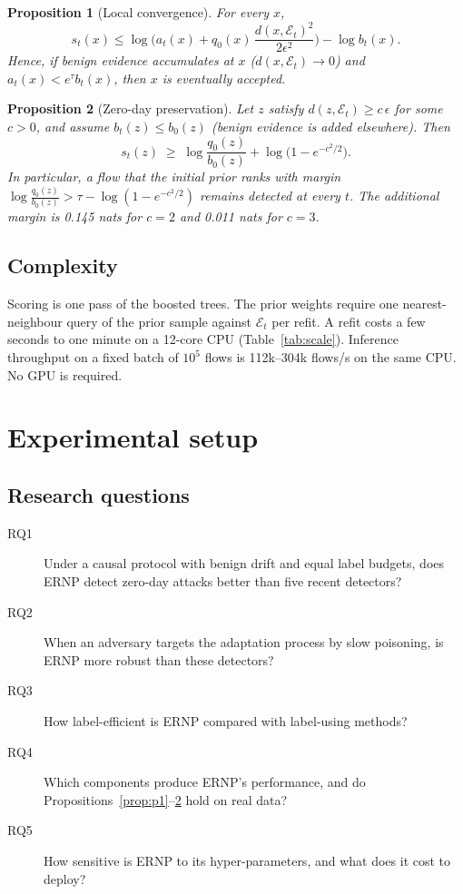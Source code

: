 \documentclass[preprint,12pt]{elsarticle}
\newtheorem{proposition}{Proposition}
\newcommand{\E}{\mathcal{E}}
\begin{document}
\begin{proposition}[Local convergence]\label{prop:p2}
For every $x$,
\begin{equation}
s_t(x)\le \log\!\Big(a_t(x)+q_0(x)\,\frac{d(x,\E_t)^2}{2\epsilon^2}\Big)-\log b_t(x).
\end{equation}
Hence, if benign evidence accumulates at $x$ ($d(x,\E_t)\to0$) and $a_t(x)<e^{\tau}b_t(x)$, then $x$ is eventually accepted.
\end{proposition}

\begin{proposition}[Zero-day preservation]\label{prop:p3}
Let $z$ satisfy $d(z,\E_t)\ge c\,\epsilon$ for some $c>0$, and assume $b_t(z)\le b_0(z)$ (benign evidence is added elsewhere). Then
\begin{equation}
s_t(z)\;\ge\;\log\frac{q_0(z)}{b_0(z)}+\log\!\big(1-e^{-c^2/2}\big).
\end{equation}
In particular, a flow that the initial prior ranks with margin $\log\frac{q_0(z)}{b_0(z)}>\tau-\log(1-e^{-c^2/2})$ remains detected at every $t$. The additional margin is 0.145 nats for $c=2$ and 0.011 nats for $c=3$.
\end{proposition}

\subsection{Complexity}
Scoring is one pass of the boosted trees. The prior weights require one nearest-neighbour query of the prior sample against $\E_t$ per refit. A refit costs a few seconds to one minute on a 12-core CPU (Table~\ref{tab:scale}). Inference throughput on a fixed batch of $10^5$ flows is 112k--304k flows/s on the same CPU. No GPU is required.

\section{Experimental setup}\label{sec:setup}
\subsection{Research questions}
\begin{description}
\item[RQ1] Under a causal protocol with benign drift and equal label budgets, does ERNP detect zero-day attacks better than five recent detectors?
\item[RQ2] When an adversary targets the adaptation process by slow poisoning, is ERNP more robust than these detectors?
\item[RQ3] How label-efficient is ERNP compared with label-using methods?
\item[RQ4] Which components produce ERNP's performance, and do Propositions~\ref{prop:p1}--\ref{prop:p3} hold on real data?
\item[RQ5] How sensitive is ERNP to its hyper-parameters, and what does it cost to deploy?
\end{description}
\end{document}
